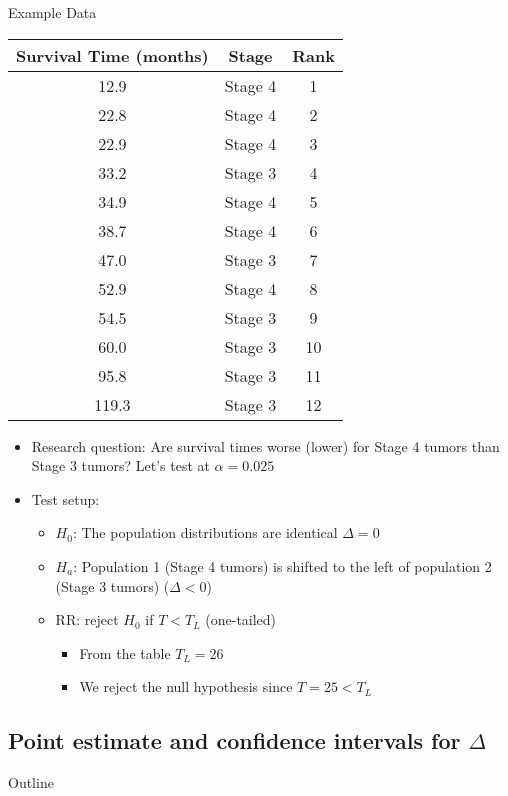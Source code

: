 \documentclass[xcolor=dvipsnames]{beamer}
\begin{document}
\begin{frame}{Example Data}
\begin{center}{\tiny
		\begin{tabular}{|c|c|c|}
			\hline
			\textbf{Survival Time (months)} &  \textbf{Stage} & \textbf{Rank}\\ \hline \hline
			12.9 &Stage 4 & 1 \\ \hline
			22.8 &Stage 4 & 2\\ \hline
			22.9& Stage 4 & 3\\ \hline
			33.2 &Stage 3 & 4\\ \hline
			34.9& Stage 4 & 5\\ \hline
			38.7 &Stage 4 & 6\\ \hline
			47.0 &Stage 3 & 7\\ \hline		
			52.9  &Stage 4 & 8\\ \hline
			54.5 &Stage 3 & 9\\ \hline				
			60.0 &Stage 3 & 10\\ \hline
			95.8& Stage 3 & 11\\ \hline
			119.3 &Stage 3 & 12\\ \hline
	\end{tabular}}
\end{center}
\begin{itemize}
	\item Research question: Are survival times worse (lower) for Stage 4 tumors than Stage 3 tumors? Let's test at $\alpha = 0.025$
	\item Test setup:
	\begin{itemize}
		\item $H_0$: The population distributions are identical $\Delta = 0$ \pause
		\item $H_a$: Population 1 (Stage 4 tumors) is shifted to the left of population 2 (Stage 3 tumors) ($\Delta < 0$) \pause
		\item RR: reject $H_0$ if $T < T_L$ (one-tailed) \pause
		\begin{itemize}
			\item From the table $T_L = 26$ \pause
			\item We reject the null hypothesis since $T = 25<T_L$
		\end{itemize}
	\end{itemize}
	
\end{itemize}
\end{frame}

\subsection{Point estimate and confidence intervals for $\Delta$}
\begin{frame}{Outline}
\tableofcontents[currentsection,subsectionstyle=show/shaded/hide]
\end{frame}
\end{document}
